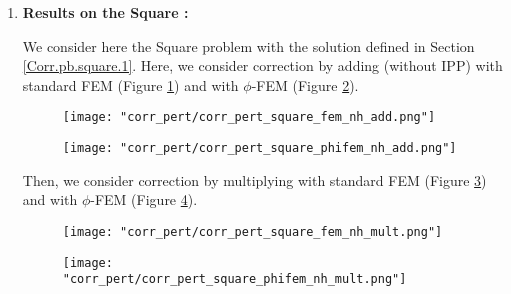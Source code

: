 \begin{enumerate}[label=\textbullet]
	\item \textbf{Results on the Square :}
	
	We consider here the Square problem with the solution defined in Section \ref{Corr.pb.square.1}. Here, we consider correction by adding (without IPP) with standard FEM (Figure \ref{corr_pert_square_fem_nh_add}) and with $\phi$-FEM (Figure \ref{corr_pert_square_phifem_nh_add}).
	
	\begin{minipage}{0.48\linewidth}
		\begin{figure}[H]
			\centering
			\texttt{[image: "corr\_pert/corr\_pert\_square\_fem\_nh\_add.png"]}
			\label{corr_pert_square_fem_nh_add}
		\end{figure} 
	\end{minipage}
	\begin{minipage}{0.48\linewidth}
		\begin{figure}[H]
			\centering
			\texttt{[image: "corr\_pert/corr\_pert\_square\_phifem\_nh\_add.png"]}
			\label{corr_pert_square_phifem_nh_add}
		\end{figure} 
	\end{minipage}
	
	Then, we consider correction by multiplying with standard FEM (Figure \ref{corr_pert_square_fem_nh_mult}) and with $\phi$-FEM (Figure \ref{corr_pert_square_phifem_nh_mult}).
	
	\begin{minipage}{0.48\linewidth}
		\begin{figure}[H]
			\centering
			\texttt{[image: "corr\_pert/corr\_pert\_square\_fem\_nh\_mult.png"]}
			\label{corr_pert_square_fem_nh_mult}
		\end{figure} 
	\end{minipage}
	\begin{minipage}{0.48\linewidth}
		\begin{figure}[H]
			\centering
			\texttt{[image: "corr\_pert/corr\_pert\_square\_phifem\_nh\_mult.png"]}
			\label{corr_pert_square_phifem_nh_mult}
		\end{figure} 
	\end{minipage}
\end{enumerate}

